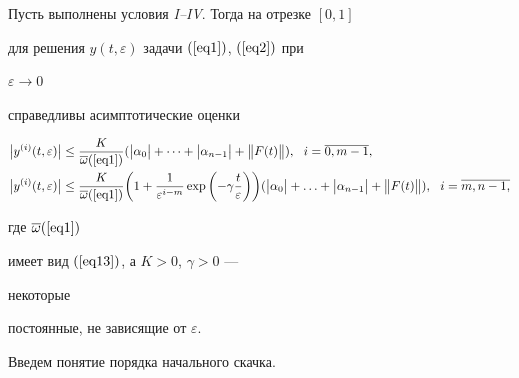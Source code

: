 \begin{thm}


Пусть выполнены условия {\em I--IV}. Тогда на отрезке $[0,1]$ 


для решения $y(t,\varepsilon )$ задачи $(\ref{eq1})$, $(\ref{eq2})$ при 


$\varepsilon \to 0$ 


справедливы асимптотические оценки


\begin{align*}


{\big| {y^{(i)}(t,\varepsilon )} \big|} &\le {\frac{{K}}{{\overline {\omega 


}(\ref{eq1})}}}({\big| {\alpha _{0}}  \big|} +\dotsb + {\big| {\alpha_{n - 


1}}  


\big|} + {\big\| {F(t)} \big\|}),\ \ i = \overline {0,m - 1}, \\


%


{\big| {y^{(i)}(t,\varepsilon )} \big|} &\le {\frac{{K}}{{\overline {\omega 


}(\ref{eq1})}}}\bigg( {1+{\frac{{1}}{{\varepsilon ^{i - m}}}}\exp \bigg({- 


\gamma {\frac{{t}}{{\varepsilon}} }} \bigg)} \bigg)({\big| {\alpha _{0}}  


\big|} + \dotsc + {\big| {\alpha _{n - 1}}  \big|} + {\big\| {F(t)} 


\big\|}),\ \ i = \overline {m,n - 1,} 


\end{align*}


где $\overline {\omega} (\ref{eq1})$


имеет вид $(\ref{eq13})$, а $K > 0$, $\gamma > 0$ ---


некоторые 


постоянные, не зависящие от $\varepsilon $.


\end{thm}





Введем понятие порядка начального скачка.





